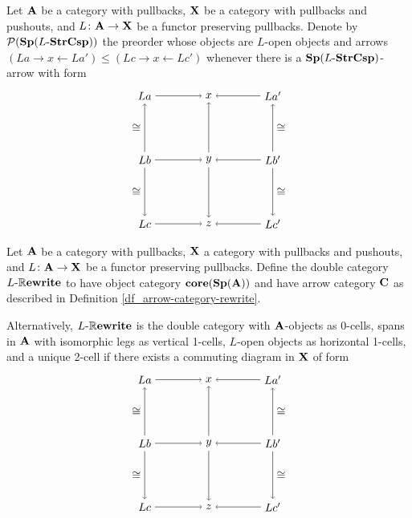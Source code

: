 \documentclass{amsart}
\begin{document}
\begin{df} \label{df_arrow-category-rewrite}
	Let $ \mathbf{A} $ be a category with pullbacks, $ \mathbf{X} $ be a category with pullbacks and pushouts, and $ L \colon \mathbf{A} \to \mathbf{X} $ be a functor preserving pullbacks.  Denote by $ \mathcal{P}(\mathbf{Sp}(L \text{-} \mathbf{StrCsp})) $ the preorder whose objects are $ L $-open objects and arrows $ (L a \to x \gets L a') \leq (L c \to x \gets L c') $ whenever there is a $ \mathbf{Sp}(L \text{-} \mathbf{StrCsp}) $-arrow with form
	\[
	\begin{tikzpicture}
	\node (a) at (-1,1) {$ L a $};
	\node (x) at (1,1) {$ x $};
	\node (a') at (3,1) {$ L a' $};
	\node (b) at (-1,-1) {$ L b $};
	\node (y) at (1,-1) {$ y $};
	\node (b') at (3,-1) {$ L b' $};
	\node (c) at (-1,-3) {$ L c $};
	\node (z) at (1,-3) {$ z $};
	\node (c') at (3,-3) {$ L c' $};
	\draw [->] (a) to (x);
	\draw [->] (a') to (x);
	\draw [->] (b) to (y);
	\draw [->] (b') to (y);
	\draw [->] (c) to (z);
	\draw [->] (c') to (z);
	\draw [->] (b) to node [left] {$ \cong $} (a);
	\draw [->] (b) to node [left] {$ \cong $} (c);
	\draw [->] (y) to (x);
	\draw [->] (y) to (z);
	\draw [->] (b') to node [right] {$ \cong $} (a');
	\draw [->] (b') to node [right] {$ \cong $} (c');
	\end{tikzpicture}
	\]
\end{df}

\begin{df} \label{df_rewrite-dble-cat}
	Let $ \mathbf{A} $ be a category with pullbacks, $ \mathbf{X} $ a category with pullbacks and pushouts, and $ L \colon \mathbf{A} \to \mathbf{X} $ be a functor preserving pullbacks.	Define the double category $ L \text{-} \mathbb{R}\mathbf{ewrite} $ to have object category $ \mathbf{core}( \mathbf{Sp}( \mathbf{A} ) ) $ and have arrow category $ \mathbf{C} $
	as described in Definition \ref{df_arrow-category-rewrite}.
	
	Alternatively, $ L \text{-} \mathbb{R}\mathbf{ewrite} $ is the double category with $ \mathbf{A} $-objects as 0-cells, spans in $ \mathbf{A} $ with isomorphic legs as vertical 1-cells, $ L $-open objects as horizontal 1-cells, and a unique 2-cell if there exists a commuting diagram in $ \mathbf{X} $ of form	
	\[
	\begin{tikzpicture}
	\node (a) at (-1,1) {$ L a $};
	\node (x) at (1,1) {$ x $};
	\node (a') at (3,1) {$ L a' $};
	\node (b) at (-1,-1) {$ L b $};
	\node (y) at (1,-1) {$ y $};
	\node (b') at (3,-1) {$ L b' $};
	\node (c) at (-1,-3) {$ L c $};
	\node (z) at (1,-3) {$ z $};
	\node (c') at (3,-3) {$ L c' $};
	\draw [->] (a) to (x);
	\draw [->] (a') to (x);
	\draw [->] (b) to (y);
	\draw [->] (b') to (y);
	\draw [->] (c) to (z);
	\draw [->] (c') to (z);
	\draw [->] (b) to node [left] {$ \cong $} (a);
	\draw [->] (b) to node [left] {$ \cong $} (c);
	\draw [->] (y) to (x);
	\draw [->] (y) to (z);
	\draw [->] (b') to node [right] {$ \cong $} (a');
	\draw [->] (b') to node [right] {$ \cong $} (c');
	\end{tikzpicture}
	\]	
\end{df}
\end{document}
